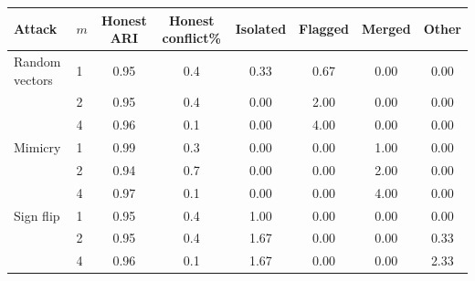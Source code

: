 \scriptsize
\setlength{\tabcolsep}{4pt}
\begin{tabular}{llcccccc}
\toprule
Attack & $m$ & Honest ARI & Honest conflict\% & Isolated & Flagged & Merged & Other \\
\midrule
Random vectors & 1 & 0.95 & 0.4 & 0.33 & 0.67 & 0.00 & 0.00 \\
 & 2 & 0.95 & 0.4 & 0.00 & 2.00 & 0.00 & 0.00 \\
 & 4 & 0.96 & 0.1 & 0.00 & 4.00 & 0.00 & 0.00 \\
\midrule
Mimicry & 1 & 0.99 & 0.3 & 0.00 & 0.00 & 1.00 & 0.00 \\
 & 2 & 0.94 & 0.7 & 0.00 & 0.00 & 2.00 & 0.00 \\
 & 4 & 0.97 & 0.1 & 0.00 & 0.00 & 4.00 & 0.00 \\
\midrule
Sign flip & 1 & 0.95 & 0.4 & 1.00 & 0.00 & 0.00 & 0.00 \\
 & 2 & 0.95 & 0.4 & 1.67 & 0.00 & 0.00 & 0.33 \\
 & 4 & 0.96 & 0.1 & 1.67 & 0.00 & 0.00 & 2.33 \\
\bottomrule
\end{tabular}
